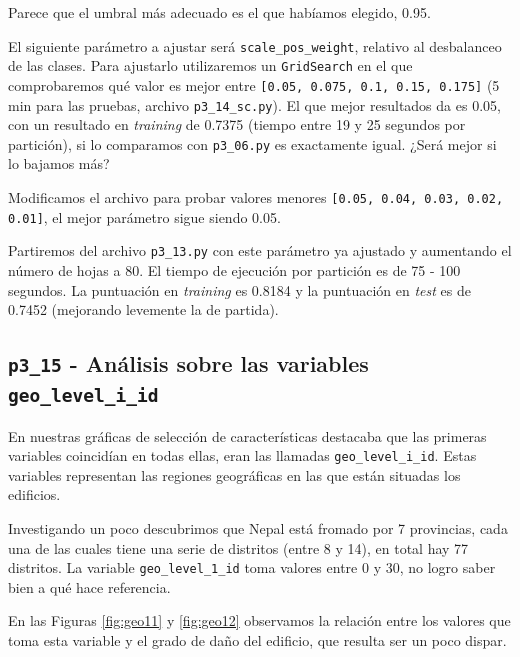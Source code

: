 \documentclass[a4paper, 20pt]{article}
\begin{document}
Parece que el umbral más adecuado es el que habíamos elegido, 0.95.

El siguiente parámetro a ajustar será \texttt{scale\_pos\_weight}, relativo al desbalanceo de las clases. Para ajustarlo utilizaremos un \texttt{GridSearch} en el que comprobaremos qué valor es mejor entre \texttt{[0.05, 0.075, 0.1, 0.15, 0.175]} (5 min para las pruebas, archivo \texttt{p3\_14\_sc.py}). El que mejor resultados da es 0.05, con un resultado en \textit{training} de 0.7375 (tiempo entre 19 y 25 segundos por partición), si lo comparamos con \texttt{p3\_06.py} es exactamente igual. ¿Será mejor si lo bajamos más?

Modificamos el archivo para probar valores menores \texttt{[0.05, 0.04, 0.03, 0.02, 0.01]}, el mejor parámetro sigue siendo 0.05.

Partiremos del archivo \texttt{p3\_13.py} con este parámetro ya ajustado y aumentando el número de hojas a 80. El tiempo de ejecución por partición es de 75 - 100 segundos. La puntuación en \textit{training} es 0.8184 y la puntuación en \textit{test} es de 0.7452 (mejorando levemente la de partida).

\subsection{\texttt{p3\_15} - Análisis sobre las variables \texttt{geo\_level\_i\_id}}

En nuestras gráficas de selección de características destacaba que las primeras variables coincidían en todas ellas, eran las llamadas \texttt{geo\_level\_i\_id}. Estas variables representan las regiones geográficas en las que están situadas los edificios.

Investigando un poco descubrimos que Nepal está fromado por 7 provincias, cada una de las cuales tiene una serie de distritos (entre 8 y 14), en total hay 77 distritos. La variable \texttt{geo\_level\_1\_id} toma valores entre 0 y 30, no logro saber bien a qué hace referencia.

En las Figuras \ref{fig:geo11} y \ref{fig:geo12} observamos la relación entre los valores que toma esta variable y el grado de daño del edificio, que resulta ser un poco dispar.
\end{document}
